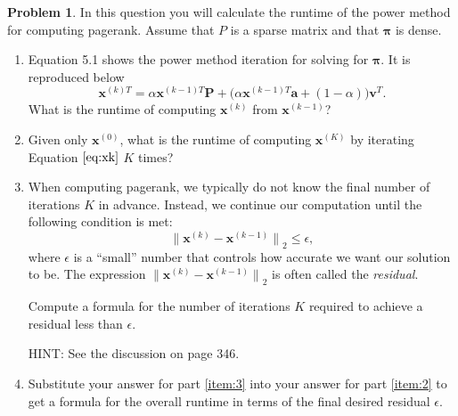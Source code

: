 \documentclass[10pt]{article}
\theoremstyle{definition}
\newtheorem{problem}{Problem}
\newcommand{\p}{\mathbf P}
\newcommand{\pr}{\bm \pi}
\newcommand{\x}{\mathbf x}
\newcommand{\ltwo}[1]{{\lVert {#1} \rVert}_2}
\begin{document}
\begin{problem}
    \label{prob:sparse}
    In this question you will calculate the runtime of the power method for computing pagerank.
    Assume that $P$ is a sparse matrix and that $\pr$ is dense.

    \begin{enumerate}
        \item
            Equation 5.1 shows the power method iteration for solving for $\pr$.
            It is reproduced below
            \begin{equation}
                \x^{(k)T}
                =
                \alpha \x^{(k-1)T} \p + \big(\alpha \x^{(k-1)T} \mathbf a + (1-\alpha)\big) \mathbf v^T
                .
                \label{eq:xk}
            \end{equation}
            What is the runtime of computing $\x^{(k)}$ from $\x^{(k-1)}$? %
            \vspace{4in}

        \item 
            \label{item:2}
            Given only $\x^{(0)}$, what is the runtime of computing $\x^{(K)}$ by iterating Equation $\eqref{eq:xk}$ $K$ times?
            \vspace{4in}

        \item
            \label{item:3}
            When computing pagerank,
            we typically do not know the final number of iterations $K$ in advance.
            Instead, we continue our computation until the following condition is met:
            \begin{equation}
                \ltwo { \x^{(k)} - \x^{(k-1)} } \le \epsilon,
            \end{equation}
            where $\epsilon$ is a ``small'' number that controls how accurate we want our solution to be.
            The expression $\ltwo { \x^{(k)} - \x^{(k-1)} }$ is often called the \emph{residual}.

            Compute a formula for the number of iterations $K$ required to achieve a residual less than $\epsilon$.

            HINT:
            See the discussion on page 346.
            \vspace{4in}

        \item
            Substitute your answer for part \ref{item:3} into your answer for part \ref{item:2} to get a formula for the overall runtime in terms of the final desired residual $\epsilon$.
            \vspace{4in}


\end{enumerate}
\end{problem}
\end{document}

